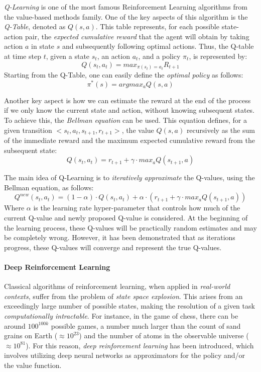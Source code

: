 \documentclass[12pt,a4paper,openright,twoside]{book}
\begin{document}
\emph{Q-Learning} is one of the most famous Reinforcement Learning algorithms from the value-based methods family. 
    One of the key aspects of this algorithm is the \emph{Q-Table}, denoted as $Q(s,a)$. This table represents, 
    for each possible state-action pair, the \emph{expected cumulative reward} that the agent will obtain by
    taking action $a$ in state $s$ and subsequently following optimal actions. 
    Thus, the Q-table at time step $t$, given a state $s_t$, an action $a_t$, and a policy $\pi_t$, is represented by:
    $$ Q(s_t, a_t) = max_{\pi(s_t) = a_t} R_{t+1}$$
    Starting from the Q-Table, one can easily define the \emph{optimal policy} as follows:
    $$ \pi^{*}(s) = argmax_a Q(s,a) $$

Another key aspect is how we can estimate the reward at the end of the process if we only know the current state 
    and action, without knowing subsequent states. To achieve this, the \emph{Bellman equation} can be used. 
    This equation defines, for a given transition $<s_t, a_t, s_{t+1}, r_{t+1}>$, the value $Q(s,a)$ recursively 
    as the sum of the immediate reward and the maximum expected cumulative reward from the subsequent state:
    $$ Q(s_t,a_t) =  r_{t+1} + \gamma \cdot max_a Q(s_{t+1}, a)$$

The main idea of Q-Learning is to \emph{iteratively approximate} the Q-values, using the Bellman equation, as follows:
$$ Q^{new}(s_t,a_t) = (1-\alpha) \cdot Q(s_t,a_t) + \alpha \cdot (r_{t+1} + \gamma \cdot max_a Q(s_{t+1}, a)) $$
    Where $\alpha$ is the learning rate hyper-parameter that controls how much of the current Q-value and newly proposed
    Q-value is considered.
    At the beginning of the learning process, these Q-values will be practically random estimates and may be completely wrong. 
    However, it has been demonstrated that as iterations progress, these Q-values will 
    converge and represent the true Q-values.

\paragraph{Deep Reinforcement Learning}

Classical algorithms of reinforcement learning, when applied in \emph{real-world contexts}, suffer from the problem of \emph{state space explosion}.
    This arises from an exceedingly large number of possible states, making the resolution of a given task \emph{computationally intractable}. 
    For instance, in the game of chess, there can be around $100^{100k}$ possible games, a number much larger than 
    the count of sand grains on Earth ($\approx 10^{23}$) and the number of atoms in the observable universe 
    ($\approx 10^{81}$). 
    For this reason, \emph{deep reinforcement learning} has been introduced, which involves utilizing deep neural networks
    as approximators for the policy and/or the value function.
\end{document}
